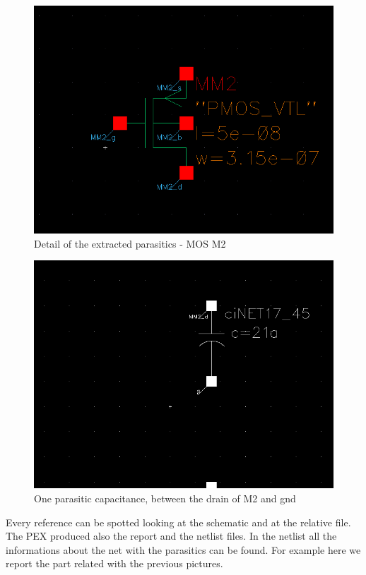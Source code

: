 \documentclass[a4paper]{article}
\begin{document}
\begin{figure}[H]
      \centering
       \includegraphics[width=12cm]{./Images/HA/HAX1_PEX_1.png}
\caption{Detail of the extracted parasitics - MOS M2}
\label{fig: PEX1}
\end{figure}

\begin{figure}[H]
      \centering
       \includegraphics[width=12cm]{./Images/HA/HAX1_PEX_2.png}
\caption{One parasitic capacitance, between the drain of M2 and gnd}
\label{fig: PEX2}
\end{figure}

Every reference can be spotted looking at the schematic and at the relative file. The PEX produced also the report and the netlist files. In the netlist all the informations about the net with the parasitics can be found. For example here we report the part related with the previous pictures.
\end{document}
